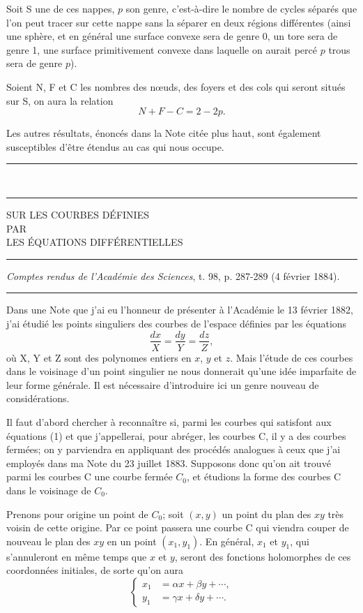 \documentclass[11pt]{article}
\newcommand{\ornament}{\begin{center}\rule{2.5em}{0.4pt}\,\raisebox{0.1ex}{\tiny$\bullet\bullet\bullet$}\,\rule{2.5em}{0.4pt}\end{center}}
\newcommand{\shortline}{\begin{center}\rule{3.5em}{0.4pt}\end{center}}
\begin{document}
Soit S une de ces nappes, $p$ son genre, c’est-à-dire le nombre de cycles séparés que l’on peut tracer sur cette nappe sans la séparer en deux régions différentes (ainsi une sphère, et en général une surface convexe sera de genre 0, un tore sera de genre 1, une surface primitivement convexe dans laquelle on aurait percé $p$ trous sera de genre $p$).

Soient N, F et C les nombres des nœuds, des foyers et des cols qui seront situés sur S, on aura la relation
\[
N+F-C=2-2p.
\]

Les autres résultats, énoncés dans la Note citée plus haut, sont également susceptibles d’être étendus au cas qui nous occupe.

\ornament
\clearpage

\begin{center}
{\Large SUR LES COURBES DÉFINIES}\\[0.8em]
{\small PAR}\\[0.8em]
{\large LES ÉQUATIONS DIFFÉRENTIELLES}
\end{center}
\shortline
\begin{center}
\emph{Comptes rendus de l’Académie des Sciences}, t. 98, p. 287-289 (4 février 1884).
\end{center}
\shortline

Dans une Note que j’ai eu l’honneur de présenter à l’Académie le 13 février 1882, j’ai étudié les points singuliers des courbes de l’espace définies par les équations
\begin{equation}\tag{1}
\frac{dx}{X}=\frac{dy}{Y}=\frac{dz}{Z},
\end{equation}
où X, Y et Z sont des polynomes entiers en $x$, $y$ et $z$. Mais l’étude de ces courbes dans le voisinage d’un point singulier ne nous donnerait qu’une idée imparfaite de leur forme générale. Il est nécessaire d’introduire ici un genre nouveau de considérations.

Il faut d’abord chercher à reconnaître si, parmi les courbes qui satisfont aux équations (1) et que j’appellerai, pour abréger, les courbes C, il y a des courbes fermées; on y parviendra en appliquant des procédés analogues à ceux que j’ai employés dans ma Note du 23 juillet 1883. Supposons donc qu’on ait trouvé parmi les courbes C une courbe fermée $C_0$, et étudions la forme des courbes C dans le voisinage de $C_0$.

Prenons pour origine un point de $C_0$; soit $(x,y)$ un point du plan des $xy$ très voisin de cette origine. Par ce point passera une courbe C qui viendra couper de nouveau le plan des $xy$ en un point $(x_1,y_1)$. En général, $x_1$ et $y_1$, qui s’annuleront en même temps que $x$ et $y$, seront des fonctions holomorphes de ces coordonnées initiales, de sorte qu’on aura
\begin{equation}\tag{2}
\left\{
\begin{aligned}
x_1&=\alpha x+\beta y+\cdots,\\
y_1&=\gamma x+\delta y+\cdots.
\end{aligned}
\right.
\end{equation}
\end{document}

